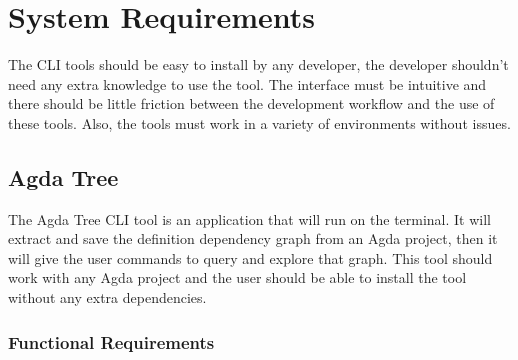 
\chapter{System Requirements} \label{ch:system requirements}

The CLI tools should be easy to install by any developer, the developer
shouldn't need any extra knowledge to use the tool. The interface must be
intuitive and there should be little friction between the development workflow
and the use of these tools. Also, the tools must work in a variety of environments
without issues.


\section{Agda Tree}

The Agda Tree CLI tool is an application that will run on the terminal. It
will extract and save the definition dependency graph from an Agda project,
then it will give the user commands to query and explore that graph. This tool
should work with any Agda project and the user should be able to install the
tool without any extra dependencies.


\subsection{Functional Requirements}

